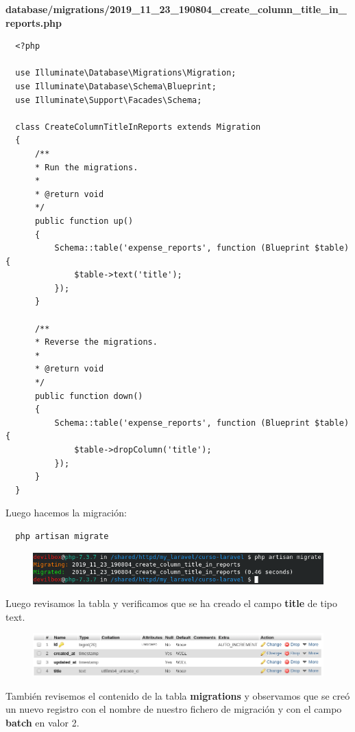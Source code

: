 \documentclass{article}
\begin{document}
\textbf{database/migrations/2019\_11\_23\_190804\_create\_column\_title\_in\_reports.php}
\begin{verbatim}
  <?php

  use Illuminate\Database\Migrations\Migration;
  use Illuminate\Database\Schema\Blueprint;
  use Illuminate\Support\Facades\Schema;

  class CreateColumnTitleInReports extends Migration
  {
      /**
      * Run the migrations.
      *
      * @return void
      */
      public function up()
      {
          Schema::table('expense_reports', function (Blueprint $table) {
              $table->text('title');
          });
      }

      /**
      * Reverse the migrations.
      *
      * @return void
      */
      public function down()
      {
          Schema::table('expense_reports', function (Blueprint $table) {
              $table->dropColumn('title');
          });
      }
  }
\end{verbatim}

Luego hacemos la migración:
\begin{verbatim}
  php artisan migrate
\end{verbatim}

\begin{figure}[h!]
  \centering
  \includegraphics[scale=0.5]{./Pictures/041_migrate.png}
\end{figure}

Luego revisamos la tabla y verificamos que se ha creado el campo
\textbf{title} de tipo text.\\

\begin{figure}[h!]
  \centering
  \includegraphics[scale=0.5]{./Pictures/043_title.png}
\end{figure}

También revisemos el contenido de la tabla \textbf{migrations} y observamos que
se creó un nuevo registro con el nombre de nuestro fichero de migración y con
el campo \textbf{batch} en valor 2.\\
\end{document}

